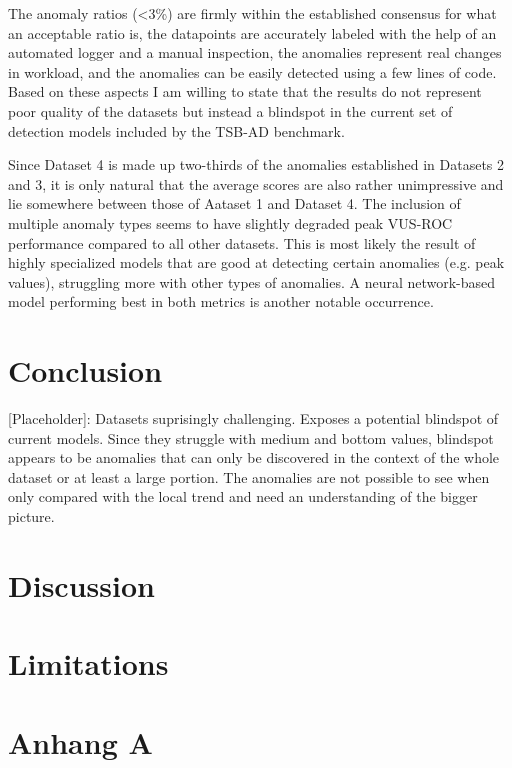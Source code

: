 \documentclass[12pt,oneside]{article}
\begin{document}
The anomaly ratios (<3\%) are firmly within the established consensus for what an acceptable ratio is, the datapoints are accurately labeled with the help of an automated logger and a manual inspection, the anomalies represent real changes in workload, and the anomalies can be easily detected using a few lines of code. Based on these aspects I am willing to state that the results do not represent poor quality of the datasets but instead a blindspot in the current set of detection models included by the TSB-AD benchmark. \par
Since Dataset 4 is made up two-thirds of the anomalies established in Datasets 2 and 3, it is only natural that the average scores are also rather unimpressive and lie somewhere between those of Aataset 1 and Dataset 4. The inclusion of multiple anomaly types seems to have slightly degraded peak VUS-ROC performance compared to all other datasets. This is most likely the result of highly specialized models that are good at detecting certain anomalies (e.g. peak values), struggling more with other types of anomalies. A neural network-based model performing best in both metrics is another notable occurrence.

\section{Conclusion}

[Placeholder]: Datasets suprisingly challenging. Exposes a potential blindspot of current models. Since they struggle with medium and bottom values, blindspot appears to be anomalies that can only be discovered in the context of the whole dataset or at least a large portion. The anomalies are not possible to see when only compared with the local trend and need an understanding of the bigger picture.

\section{Discussion}

\section{Limitations}






\clearpage
\lhead{}
\printbibliography
{}


\clearpage
\appendix
\section{Anhang A}


\end{document}
